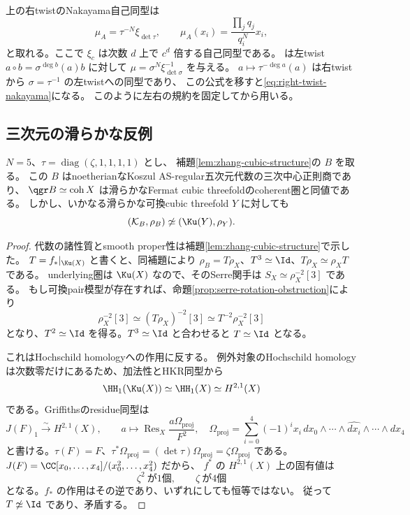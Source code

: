 \begin{remark}[右twistにおけるNakayamaの規約]
\label{rem:zhang-nakayama}
 上の右twistのNakayama自己同型は
 \begin{equation}\label{eq:right-twist-nakayama}
 \mu_A=\tau^{-N}\xi_{\det\tau},\qquad
 \mu_A(x_i)=\frac{\prod_jq_j}{q_i^N}x_i,
 \end{equation}
 と取れる。ここで \(\xi_c\) は次数 \(d\) 上で \(c^d\) 倍する自己同型である。
 \cite[Theorem 5.4]{RRZ}は左twist
 \(a\circ b=\sigma^{\deg b}(a)b\) に対して
 \(\mu=\sigma^N\xi_{\det\sigma}^{-1}\) を与える。
 \(a\mapsto\tau^{-\deg a}(a)\) は右twistから \(\sigma=\tau^{-1}\) の左twistへの同型であり、
 この公式を移すと\eqref{eq:right-twist-nakayama}になる。
 このように左右の規約を固定してから用いる。
\end{remark}

\subsection{三次元の滑らかな反例}

\begin{theorem}
\label{thm:zhang-threefold-counterexample}
 \(N=5\)、\(\tau=\operatorname{diag}(\zeta,1,1,1,1)\) とし、
 補題\ref{lem:zhang-cubic-structure}の \(B\) を取る。
 この \(B\) はnoetherianなKoszul AS-regular五次元代数の三次中心正則商であり、
 \(\qgr B\simeq\operatorname{coh}X\) は滑らかなFermat cubic threefoldのcoherent圏と同値である。
 しかし、いかなる滑らかな可換cubic threefold \(Y\) に対しても
 \[
 (\mathcal K_B,\rho_B)\not\simeq(\Ku(Y),\rho_Y).
 \]
\end{theorem}
\begin{proof}
 代数の諸性質とsmooth proper性は補題\ref{lem:zhang-cubic-structure}で示した。
 \(T=f_*|_{\Ku(X)}\) と書くと、同補題により
 \(\rho_B=T\rho_X\)、\(T^3\simeq\Id\)、\(T\rho_X\simeq\rho_XT\) である。
 underlying圏は \(\Ku(X)\) なので、そのSerre関手は
 \(S_X\simeq\rho_X^{-2}[3]\) である。
 もし可換pair模型が存在すれば、命題\ref{prop:serre-rotation-obstruction}により
 \[
 \rho_X^{-2}[3]\simeq (T\rho_X)^{-2}[3]
       \simeq T^{-2}\rho_X^{-2}[3]
 \]
 となり、\(T^2\simeq\Id\) を得る。\(T^3\simeq\Id\) と合わせると \(T\simeq\Id\) となる。

 これはHochschild homologyへの作用に反する。
 例外対象のHochschild homologyは次数零だけにあるため、加法性とHKR同型から
 \[
 \HH_1(\Ku(X))\simeq\HH_1(X)\simeq H^{2,1}(X)
 \]
 である。Griffithsのresidue同型\cite{Griffiths}は
 \[
 J(F)_1\xrightarrow{\sim}H^{2,1}(X),\qquad
 a\longmapsto\operatorname{Res}_X\frac{a\Omega_{\mathrm{proj}}}{F^2},
 \quad
 \Omega_{\mathrm{proj}}=
 \sum_{i=0}^4(-1)^i x_i\,dx_0\wedge\cdots\wedge\widehat{dx_i}\wedge\cdots\wedge dx_4
 \]
 と書ける。\(\tau(F)=F\)、\(\tau^*\Omega_{\mathrm{proj}}=(\det\tau)\Omega_{\mathrm{proj}}
 =\zeta\Omega_{\mathrm{proj}}\) である。
 \(J(F)=\CC[x_0,\ldots,x_4]/(x_0^2,\ldots,x_4^2)\) だから、
 \(f^*\) の \(H^{2,1}(X)\) 上の固有値は
 \[
 \zeta^2\ \text{が1個},\qquad \zeta\ \text{が4個}
 \]
 となる。\(f_*\) の作用はその逆であり、いずれにしても恒等ではない。
 従って \(T\not\simeq\Id\) であり、矛盾する。
\end{proof}

